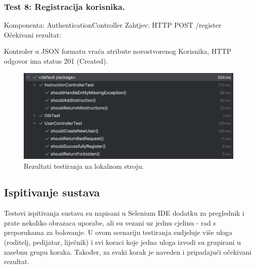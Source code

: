 			\subsubsection*{Test 8: Registracija korisnika.}
			Komponenta: AuthenticationController \newline
			Zahtjev: HTTP POST /register \newline
			Očekivani rezultat:
			\begin{packed_item}
				\item Kontroler u JSON formatu vraća atribute novostvorenog Korisnika, HTTP odgovor ima status 201 (Created).
			\end{packed_item}
			

			\begin{figure}[H]
				\includegraphics[width=\textwidth]{slike/testing_results.png} 
				\caption{Rezultati testiranja na lokalnom stroju.} 
			\end{figure}
			
			\subsection{Ispitivanje sustava}
			Testovi ispitivanja sustava su napisani u Selenium IDE dodatku za preglednik i prate nekoliko obrazaca uporabe, ali su vezani uz jednu cjelinu - rad s preporukama za bolovanje.
			U ovom scenariju testiranja sudjeluje više uloga (roditelj, pedijatar, liječnik) i svi koraci koje jedna uloga izvodi su grupirani u zasebnu grupu koraka. Također, za svaki korak je
			naveden i pripadajući očekivani rezultat.
			
